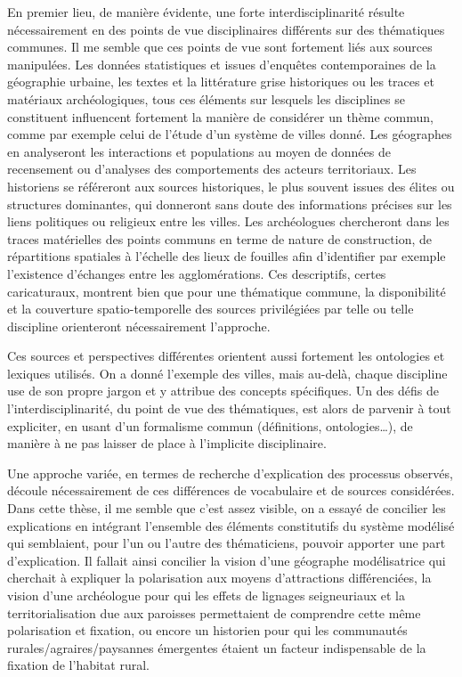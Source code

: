 En premier lieu, de manière évidente, une forte interdisciplinarité résulte nécessairement en des points de vue disciplinaires différents sur des thématiques communes.
Il me semble que ces points de vue sont fortement liés aux sources manipulées.
Les données statistiques et issues d'enquêtes contemporaines de la géographie urbaine, les textes et la littérature grise historiques ou les traces et matériaux archéologiques, tous ces éléments sur lesquels les disciplines se constituent influencent fortement la manière de considérer un thème commun, comme par exemple celui de l'étude d'un système de villes donné.
Les géographes en analyseront les interactions et populations au moyen de données de recensement ou d'analyses des comportements des acteurs territoriaux.
Les historiens se référeront aux sources historiques, le plus souvent issues des élites ou structures dominantes, qui donneront sans doute des informations précises sur les liens politiques ou religieux entre les villes.
Les archéologues chercheront dans les traces matérielles des points communs en terme de nature de construction, de répartitions spatiales à l'échelle des lieux de fouilles afin d'identifier par exemple l'existence d'échanges entre les agglomérations.
Ces descriptifs, certes caricaturaux, montrent bien que pour une thématique commune, la disponibilité et la couverture spatio-temporelle des sources privilégiées par telle ou telle discipline orienteront nécessairement l'approche.

Ces sources et perspectives différentes orientent aussi fortement les ontologies et lexiques utilisés.
On a donné l'exemple des villes, mais au-delà, chaque discipline use de son propre jargon et y attribue des concepts spécifiques.
Un des défis de l'interdisciplinarité, du point de vue des thématiques, est alors de parvenir à tout expliciter, en usant d'un formalisme commun (définitions, ontologies\ldots), de manière à ne pas laisser de place à l'implicite disciplinaire.

Une approche variée, en termes de recherche d'explication des processus observés, découle nécessairement de ces différences de vocabulaire et de sources considérées.
Dans cette thèse, il me semble que c'est assez visible, on a essayé de concilier les explications en intégrant l'ensemble des éléments constitutifs du système modélisé qui semblaient, pour l'un ou l'autre des thématiciens, pouvoir apporter une part d'explication.
Il fallait ainsi concilier la vision d'une géographe modélisatrice qui cherchait à expliquer la polarisation aux moyens d'attractions différenciées, la vision d'une archéologue pour qui les effets de lignages seigneuriaux et la territorialisation due aux paroisses permettaient de comprendre cette même polarisation et fixation, ou encore un historien pour qui les communautés rurales/agraires/paysannes émergentes étaient un facteur indispensable de la fixation de l'habitat rural.

